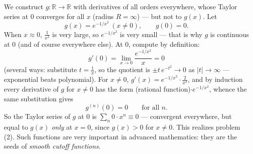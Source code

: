 \documentclass[11pt]{report}
\begin{document}
\begin{exbox}
We construct $g: \mathbb{R} \to \mathbb{R}$ with derivatives of all orders everywhere, whose Taylor series at $0$ converges for all $x$ (radius $R = \infty$) --- but not to $g(x)$. Let
\[
g(x) = e^{-1/x^2} \ (x \neq 0), \qquad g(0) = 0.
\]
When $x \approx 0$, $\tfrac{1}{x^2}$ is very large, so $e^{-1/x^2}$ is very small --- that is why $g$ is continuous at $0$ (and of course everywhere else). At $0$, compute by definition:
\[
g'(0) = \lim_{x\to0} \frac{e^{-1/x^2}}{x} = 0
\]
(several ways: substitute $t = \tfrac1x$, so the quotient is $\pm t\, e^{-t^2} \to 0$ as $|t| \to \infty$ --- exponential beats polynomial). For $x \neq 0$, $g'(x) = e^{-1/x^2}\cdot\tfrac{2}{x^3}$, and by induction every derivative of $g$ for $x \neq 0$ has the form (rational function)$\cdot e^{-1/x^2}$, whence the same substitution gives
\[
g^{(n)}(0) = 0 \qquad \text{for all } n.
\]
So the Taylor series of $g$ at $0$ is $\sum_n 0 \cdot x^n \equiv 0$ --- convergent everywhere, but equal to $g(x)$ \emph{only} at $x = 0$, since $g(x) > 0$ for $x \neq 0$. This realizes problem (2). Such functions are very important in advanced mathematics: they are the seeds of \emph{smooth cutoff functions}.
\end{exbox}
\end{document}
